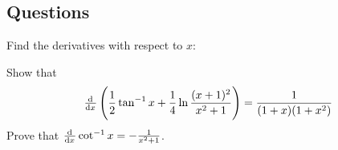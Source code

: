 \subsection*{Questions}
\begin{questions}
  \question Find the derivatives with respect to $ x $:
  \question Show that
    \begin{displaymath}
      \od{}{x} \left( \frac{1}{2} \tan^{-1} x + \frac{1}{4} \ln\frac{(x + 1)^2}{x^2 + 1} \right) = \frac{1}{(1 + x)(1 + x^2)}
    \end{displaymath}
  \question Prove that $ \od{}{x} \cot^{-1} x = -\frac{1}{x^2 + 1} $.
\end{questions}


